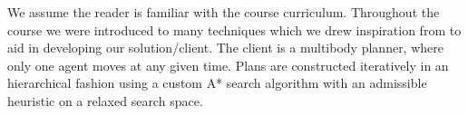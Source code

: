 We assume the reader is familiar with the course curriculum.
Throughout the course we were introduced to many techniques which we drew inspiration from to aid in developing our solution/client.
The client is a multibody planner, where only one agent moves at any given time.
Plans are constructed iteratively in an hierarchical fashion using a custom A* search algorithm with an admissible heuristic on a relaxed search space.~\cite{russell2009modern,geffner2013concise} 
